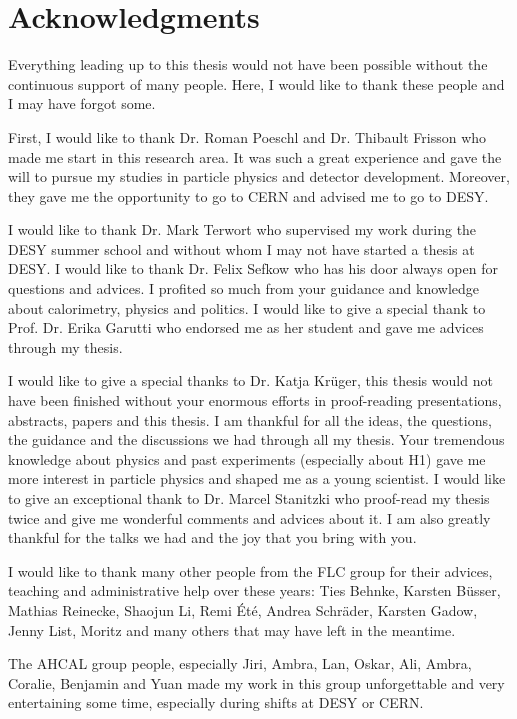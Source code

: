 \cleardoublepage
\thispagestyle{empty}
{}
\chapter*{Acknowledgments}

Everything leading up to this thesis would not have been possible without the continuous support of many people. Here, I would like to thank these people and I may have forgot some.

First, I would like to thank Dr. Roman Poeschl and Dr. Thibault Frisson who made me start in this research area. It was such a great experience and gave the will to pursue my studies in particle physics and detector development. Moreover, they gave me the opportunity to go to CERN and advised me to go to DESY.

I would like to thank Dr. Mark Terwort who supervised my work during the DESY summer school and without whom I may not have started a thesis at DESY. I would like to thank Dr. Felix Sefkow who has his door always open for questions and advices. I profited so much from your guidance and knowledge about calorimetry, physics and politics. I would like to give a special thank to Prof. Dr. Erika Garutti who endorsed me as her student and gave me advices through my thesis.

I would like to give a special thanks to Dr. Katja Kr\"uger, this thesis would not have been finished without your enormous efforts in proof-reading presentations, abstracts, papers and this thesis. I am thankful for all the ideas, the questions, the guidance and the discussions we had through all my thesis. Your tremendous knowledge about physics and past experiments (especially about H1) gave me more interest in particle physics and shaped me as a young scientist. I would like to give an exceptional thank to Dr. Marcel Stanitzki who proof-read my thesis twice and give me wonderful comments and advices about it. I am also greatly thankful for the talks we had and the joy that you bring with you.

I would like to thank many other people from the FLC group for their advices, teaching and administrative help over these years: Ties Behnke, Karsten B\"usser, Mathias Reinecke, Shaojun Li, Remi \'Et\'e, Andrea Schr\"ader, Karsten Gadow, Jenny List, Moritz and many others that may have left in the meantime.

The AHCAL group people, especially Jiri, Ambra, Lan, Oskar, Ali, Ambra, Coralie, Benjamin and Yuan made my work in this group unforgettable and very entertaining some time, especially during shifts at DESY or CERN.

